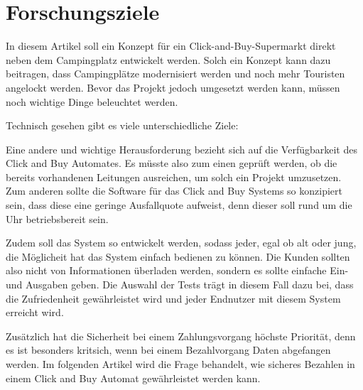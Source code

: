 \section{Forschungsziele}


In diesem Artikel soll ein Konzept für ein Click-and-Buy-Supermarkt direkt neben dem Campingplatz 
entwickelt werden. Solch ein Konzept kann dazu beitragen, dass Campingplätze modernisiert werden 
und noch mehr Touristen angelockt werden. Bevor das Projekt jedoch umgesetzt werden kann, müssen 
noch wichtige Dinge beleuchtet werden. 

Technisch gesehen gibt es viele unterschiedliche Ziele:

Eine andere und wichtige Herausforderung bezieht sich auf die Verfügbarkeit des Click and Buy Automates.
Es müsste also zum einen geprüft werden, ob die bereits vorhandenen Leitungen ausreichen, um solch ein Projekt umzusetzen.
Zum anderen sollte die Software für das Click and Buy Systems so konzipiert sein, dass diese eine geringe Ausfallquote
aufweist, denn dieser soll rund um die Uhr betriebsbereit sein.

Zudem soll das System so entwickelt werden, sodass jeder, egal ob alt oder jung, die Möglicheit hat das System einfach bedienen 
zu können. Die Kunden sollten also nicht von Informationen überladen werden, 
sondern es sollte einfache Ein- und Ausgaben geben. Die Auswahl der Tests trägt in diesem Fall dazu bei,
dass die Zufriedenheit gewährleistet wird und jeder Endnutzer mit diesem System erreicht wird.

Zusätzlich hat die Sicherheit bei einem Zahlungsvorgang höchste Priorität, denn es ist besonders kritsich, 
wenn bei einem Bezahlvorgang Daten abgefangen werden. Im folgenden Artikel wird die Frage behandelt, 
wie sicheres Bezahlen in einem Click and Buy Automat gewährleistet werden kann.